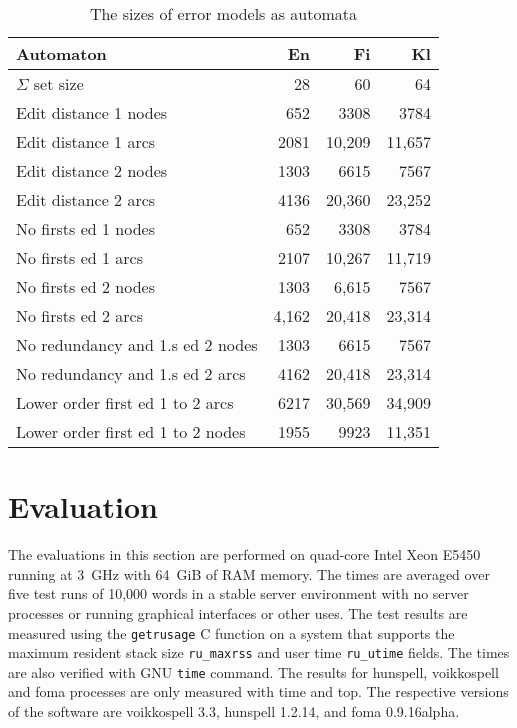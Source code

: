 \documentclass[11pt]{article}
\begin{document}
\begin{table}[h]
\begin{center}
\begin{scriptsize}
\begin{tabular}{|l|rrr|}
\hline
\bf Automaton & \bf En & \bf Fi & \bf Kl  \\ 
\hline
$\Sigma$ set size &
 28& 60& 64
\\
Edit distance 1 nodes &
 652& 3308& 3784
\\
Edit distance 1 arcs &
 2081& 10,209& 11,657
\\
Edit distance 2 nodes &
 1303& 6615& 7567
\\
Edit distance 2 arcs &
 4136& 20,360& 23,252
\\
No firsts ed 1 nodes & 
 652& 3308& 3784
\\
No firsts ed 1 arcs & 
 2107& 10,267& 11,719
\\
No firsts ed 2 nodes &
 1303& 6,615& 7567
\\
No firsts ed 2 arcs &
 4,162& 20,418& 23,314
\\
No redundancy and 1.s ed 2 nodes &
 1303& 6615& 7567
\\
No redundancy and 1.s ed 2 arcs &
 4162& 20,418& 23,314
\\
Lower order first ed 1 to 2 arcs &
6217 & 30,569 & 34,909
\\
Lower order first ed 1 to 2 nodes &
1955 & 9923 & 11,351
\\
\hline
\end{tabular}
\end{scriptsize}
\end{center}
\caption{\label{table:error-sizes}
The sizes of error models as automata}
\end{table}


\section{Evaluation}
\label{sec:evaluation}

The evaluations in this section are performed on quad-core Intel Xeon E5450
running at 3~GHz with 64~GiB of RAM memory. The times are averaged over five
test runs of 10,000 words in a stable server environment with no server processes
or running graphical interfaces or other uses. The test results are measured using the
\texttt{getrusage} C function on a system that supports the maximum resident
stack size \texttt{ru\_maxrss} and user time \texttt{ru\_utime} fields. The
times are also verified with GNU \texttt{time} command. The results for
hunspell, voikkospell and foma processes are only measured with time and top.
The respective versions of the software are voikkospell 3.3, hunspell
1.2.14, and foma 0.9.16alpha.
\end{document}
